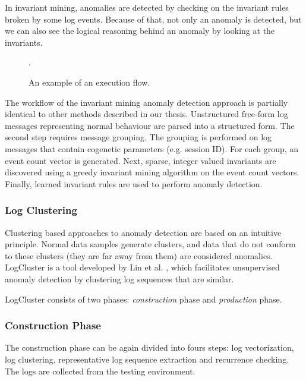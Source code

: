 In invariant mining, anomalies are detected by checking on the invariant rules broken by some log events. Because of that, not only an anomaly is detected, but we can also see the logical reasoning behind an anomaly by looking at the invariants.  

\begin{figure}\centering
	
	\caption{An example of an execution flow.}.
	\label{figure:invariantMiningExecutionFlow}
\end{figure}

The workflow of the invariant mining anomaly detection approach is partially identical to other methods described in our thesis. Unstructured free-form log messages representing normal behaviour are parsed into a structured form. The second step requires message grouping. The grouping is performed on log messages that contain cogenetic parameters (e.g. session ID). For each group, an event count vector is generated. Next, sparse, integer valued invariants are discovered using a greedy invariant mining algorithm on the event count vectors. Finally, learned invariant rules are used to perform anomaly detection.
\newpage

\subsubsection{Log Clustering}
Clustering based approaches to anomaly detection are based on an intuitive principle. Normal data samples generate clusters, and data that do not conform to these clusters (they are far away from them) are considered anomalies. LogCluster is a tool developed by Lin et al. \cite{logCluster2016}, which facilitates unsupervised anomaly detection by clustering log sequences that are similar. 

LogCluster consists of two phases: \textit{construction} phase and \textit{production} phase. 

\subsubsection*{Construction Phase}
The construction phase can be again divided into fours steps: log vectorization, log clustering, representative log sequence extraction and recurrence checking. The logs are collected from the testing environment. 

